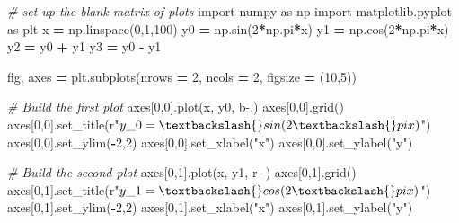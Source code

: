\documentclass[
]{book}
\newenvironment{Shaded}{\begin{snugshade}}{\end{snugshade}}
\newcommand{\CommentTok}[1]{\textcolor[rgb]{0.56,0.35,0.01}{\textit{#1}}}
\newcommand{\DecValTok}[1]{\textcolor[rgb]{0.00,0.00,0.81}{#1}}
\newcommand{\ImportTok}[1]{#1}
\newcommand{\NormalTok}[1]{#1}
\newcommand{\OperatorTok}[1]{\textcolor[rgb]{0.81,0.36,0.00}{\textbf{#1}}}
\newcommand{\StringTok}[1]{\textcolor[rgb]{0.31,0.60,0.02}{#1}}
\newcommand{\VerbatimStringTok}[1]{\textcolor[rgb]{0.31,0.60,0.02}{#1}}
\theoremstyle{definition}
\theoremstyle{definition}
\theoremstyle{definition}
\theoremstyle{remark}
\begin{document}
\begin{Shaded}
\begin{Highlighting}[]
\CommentTok{\# set up the blank matrix of plots}
\ImportTok{import}\NormalTok{ numpy }\ImportTok{as}\NormalTok{ np}
\ImportTok{import}\NormalTok{ matplotlib.pyplot }\ImportTok{as}\NormalTok{ plt}
\NormalTok{x }\OperatorTok{=}\NormalTok{ np.linspace(}\DecValTok{0}\NormalTok{,}\DecValTok{1}\NormalTok{,}\DecValTok{100}\NormalTok{)}
\NormalTok{y0 }\OperatorTok{=}\NormalTok{ np.sin(}\DecValTok{2}\OperatorTok{*}\NormalTok{np.pi}\OperatorTok{*}\NormalTok{x)}
\NormalTok{y1 }\OperatorTok{=}\NormalTok{ np.cos(}\DecValTok{2}\OperatorTok{*}\NormalTok{np.pi}\OperatorTok{*}\NormalTok{x)}
\NormalTok{y2 }\OperatorTok{=}\NormalTok{ y0 }\OperatorTok{+}\NormalTok{ y1}
\NormalTok{y3 }\OperatorTok{=}\NormalTok{ y0 }\OperatorTok{{-}}\NormalTok{ y1}

\NormalTok{fig, axes }\OperatorTok{=}\NormalTok{ plt.subplots(nrows }\OperatorTok{=} \DecValTok{2}\NormalTok{, ncols }\OperatorTok{=} \DecValTok{2}\NormalTok{, figsize }\OperatorTok{=}\NormalTok{ (}\DecValTok{10}\NormalTok{,}\DecValTok{5}\NormalTok{))}

\CommentTok{\# Build the first plot}
\NormalTok{axes[}\DecValTok{0}\NormalTok{,}\DecValTok{0}\NormalTok{].plot(x, y0, }\StringTok{\textquotesingle{}b{-}.\textquotesingle{}}\NormalTok{)}
\NormalTok{axes[}\DecValTok{0}\NormalTok{,}\DecValTok{0}\NormalTok{].grid()}
\NormalTok{axes[}\DecValTok{0}\NormalTok{,}\DecValTok{0}\NormalTok{].set\_title(}\VerbatimStringTok{r"$y\_0 = \textbackslash{}sin(2\textbackslash{}pi x)$"}\NormalTok{)}
\NormalTok{axes[}\DecValTok{0}\NormalTok{,}\DecValTok{0}\NormalTok{].set\_ylim(}\OperatorTok{{-}}\DecValTok{2}\NormalTok{,}\DecValTok{2}\NormalTok{)}
\NormalTok{axes[}\DecValTok{0}\NormalTok{,}\DecValTok{0}\NormalTok{].set\_xlabel(}\StringTok{"x"}\NormalTok{)}
\NormalTok{axes[}\DecValTok{0}\NormalTok{,}\DecValTok{0}\NormalTok{].set\_ylabel(}\StringTok{"y"}\NormalTok{)}

\CommentTok{\# Build the second plot}
\NormalTok{axes[}\DecValTok{0}\NormalTok{,}\DecValTok{1}\NormalTok{].plot(x, y1, }\StringTok{\textquotesingle{}r{-}{-}\textquotesingle{}}\NormalTok{)}
\NormalTok{axes[}\DecValTok{0}\NormalTok{,}\DecValTok{1}\NormalTok{].grid()}
\NormalTok{axes[}\DecValTok{0}\NormalTok{,}\DecValTok{1}\NormalTok{].set\_title(}\VerbatimStringTok{r"$y\_1 = \textbackslash{}cos(2\textbackslash{}pi x)$"}\NormalTok{)}
\NormalTok{axes[}\DecValTok{0}\NormalTok{,}\DecValTok{1}\NormalTok{].set\_ylim(}\OperatorTok{{-}}\DecValTok{2}\NormalTok{,}\DecValTok{2}\NormalTok{)}
\NormalTok{axes[}\DecValTok{0}\NormalTok{,}\DecValTok{1}\NormalTok{].set\_xlabel(}\StringTok{"x"}\NormalTok{)}
\NormalTok{axes[}\DecValTok{0}\NormalTok{,}\DecValTok{1}\NormalTok{].set\_ylabel(}\StringTok{"y"}\NormalTok{)}


\end{Highlighting}
\end{Shaded}
\end{document}
